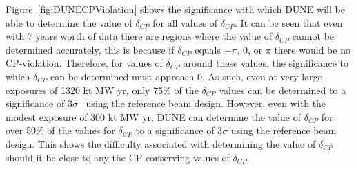 Figure~\ref{fig:DUNECPViolation} shows the significance with which DUNE will be able to determine the value of $\delta_{CP}$ for all values of $\delta_{CP}$. It can be seen that even with 7 years worth of data there are regions where the value of $\delta_{CP}$ cannot be determined accurately, this is because if $\delta_{CP}$ equals $-\pi$, 0, or $\pi$ there would be no CP-violation. Therefore, for values of $\delta_{CP}$ around these values, the significance to which $\delta_{CP}$ can be determined must approach 0. As such, even at very large exposures of 1320 kt MW yr, only 75\% of the $\delta_{CP}$ values can be determined to a significance of 3$\sigma$~\citep{DUNECDR_V2} using the reference beam design. However, even with the modest exposure of 300 kt MW yr, DUNE can determine the value of $\delta_{CP}$ for over 50\% of the values for $\delta_{CP}$ to a significance of 3$\sigma$ using the reference beam design. This shows the difficulty associated with determining the value of $\delta_{CP}$ should it be close to any the CP-conserving values of $\delta_{CP}$. \\

